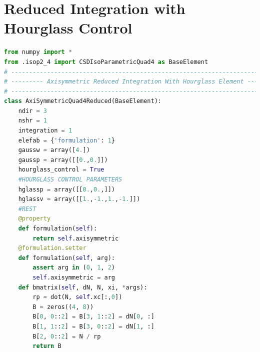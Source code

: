 \documentclass[10pt,letterpaper]{report}
\numberwithin{equation}{chapter}
\begin{document}
\section{Reduced Integration with Hourglass Control}

\begin{lstlisting}[language=Python]
from numpy import *
from .isop2_4 import CSDIsoParametricQuad4 as BaseElement
# --------------------------------------------------------------------------- #
# --------- Axisymmetric Reduced Integration With Hourglass Element --------- #
# --------------------------------------------------------------------------- #
class AxiSymmetricQuad4Reduced(BaseElement):
    ndir = 3
    nshr = 1
    integration = 1
    elefab = {'formulation': 1}
    gaussw = array([4.])
    gaussp = array([[0.,0.]])
    hourglass_control = True
    #HOURGLASS CONTROL PARAMETERS
    hglassp = array([[0.,0.,]])
    hglassv = array([[1.,-1.,1.,-1.]])
    #REST
    @property
    def formulation(self):
        return self.axisymmetric
    @formulation.setter
    def formulation(self, arg):
        assert arg in (0, 1, 2)
        self.axisymmetric = arg
    def bmatrix(self, dN, N, xi, *args):
        rp = dot(N, self.xc[:,0])
        B = zeros((4, 8))
        B[0, 0::2] = B[3, 1::2] = dN[0, :]
        B[1, 1::2] = B[3, 0::2] = dN[1, :]
        B[2, 0::2] = N / rp
        return B
\end{lstlisting}
\end{document}
